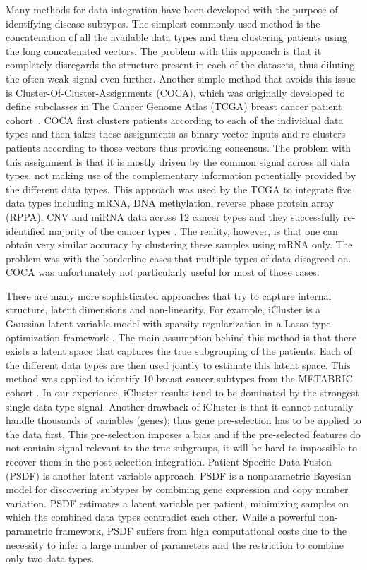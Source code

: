 \documentclass[5p]{elsarticle}
\newcommand{\rev}[1]{{\color{black}#1}}
\begin{document}
Many methods for data integration have been developed with the purpose of identifying disease subtypes. The simplest commonly used method is the concatenation of all the available data types and then clustering patients using the long concatenated vectors. The problem with this approach is that it completely disregards the structure present in each of the datasets, thus diluting the often weak signal even further. Another simple method that avoids this issue is Cluster-Of-Cluster-Assignments (COCA), which was originally developed to define subclasses in \rev{The Cancer Genome Atlas (TCGA)} breast cancer \rev{patient cohort}~\cite{Koboldt:2012}. COCA first clusters patients according to each of the individual data types and then takes these assignments as binary vector inputs and re-clusters patients according to those vectors thus providing consensus. The problem with this assignment is that it is mostly driven by the common signal across all data types, not making use of the complementary information potentially provided by the different data types. This approach was used by the TCGA to integrate five data types including mRNA, DNA methylation, \rev{reverse phase protein array} (RPPA), CNV and miRNA data across 12 cancer types and they successfully re-identified majority of the cancer types \cite{Hoadley:2014}. The reality, however, is that one can obtain very similar accuracy by clustering these samples using mRNA only. The problem was with the borderline cases that multiple types of data disagreed on. COCA was unfortunately not particularly useful for most of those cases.

There are many more sophisticated approaches that try to capture internal structure, latent dimensions and non-linearity. For example, iCluster is a Gaussian latent variable model with sparsity regularization in \rev{a Lasso-type} optimization framework \cite{Shen:2009}. The main assumption behind this method is that there exists \rev{a latent} space that captures the true subgrouping of the patients. Each of the different data types are then used jointly to estimate this latent space. This method was applied to identify 10 breast cancer subtypes from the METABRIC cohort \cite{Curtis:2012}. In our experience, iCluster results tend to be dominated by the strongest single data type signal. Another drawback of iCluster is that it cannot naturally handle thousands of variables (genes)\rev{; thus} gene pre-selection has to be applied to the data first. This pre-selection imposes a bias and if the pre-selected features do not contain signal relevant to the true subgroups, it will be hard to impossible to recover them in the post-selection integration. Patient Specific Data Fusion (PSDF) \cite{Yuan2011patient} is another latent variable approach. PSDF is a nonparametric Bayesian model for discovering subtypes by combining gene expression and copy number variation. PSDF estimates a latent variable per patient, minimizing samples on which the combined data types contradict each other. While a powerful non-parametric framework, PSDF suffers from high computational costs due to the necessity to infer a large number of parameters and the restriction to combine only two data types.
\end{document}
